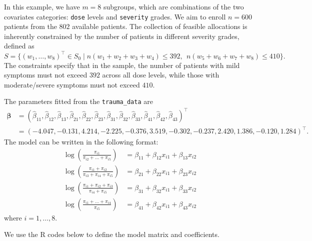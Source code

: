 In this example, we have $m=8$ subgroups, which are combinations of the two covariates categories: \texttt{dose} levels and \texttt{severity} grades. We aim to enroll $n=600$ patients from the $802$ available patients. The collection of feasible allocations is inherently constrained by the number of patients in different severity grades, defined as
$$S=\{(w_1, \ldots, w_8)^\top \in S_0 \mid n(w_1+w_2+w_3+w_4) \leq 392, ~~ n(w_5+w_6+w_7+w_8) \leq 410\}.$$
The constraints specify that in the sample, the number of patients with mild symptoms must not exceed $392$ across all dose levels, while those with moderate/severe symptoms must not exceed $410$.

The parameters fitted from the \texttt{trauma\_data} are
\begin{align*}
  \boldsymbol\beta &= (\hat\beta_{11}, \hat\beta_{12}, \hat\beta_{13}, \hat\beta_{21}, \hat\beta_{22}, \hat\beta_{23}, \hat\beta_{31}, \hat\beta_{32}, \hat\beta_{33}, \hat\beta_{41}, \hat\beta_{42}, \hat\beta_{43})^\top  \\
  & = (-4.047, -0.131, 4.214, -2.225, -0.376, 3.519, -0.302, -0.237,  2.420, 1.386,  -0.120,  1.284)^\top.
\end{align*}
The model can be written in the following format:
\begin{align*}
  \log\left(\frac{\pi_{i1}}{\pi_{i2}+\dots+\pi_{i5}}\right)
  &= \beta_{11}+\beta_{12}x_{i1}+\beta_{13}x_{i2}\\
  \log\left(\frac{\pi_{i1}+\pi_{i2}}{\pi_{i3}+\pi_{i4}+\pi_{i5}}\right)
  &= \beta_{21}+\beta_{22}x_{i1}+\beta_{23}x_{i2}\\
  \log\left(\frac{\pi_{i1}+\pi_{i2}+\pi_{i3}}{\pi_{i4}+\pi_{i5}}\right)
  &= \beta_{31}+\beta_{32}x_{i1}+\beta_{33}x_{i2}\\
  \log\left(\frac{\pi_{i1}+\dots+\pi_{i4}}{\pi_{i5}}\right)
  &=\beta_{41}+\beta_{42}x_{i1}+\beta_{43}x_{i2}
\end{align*}
where $i=1,\dots,8$.

We use the R codes below to define the model matrix and coefficients.

